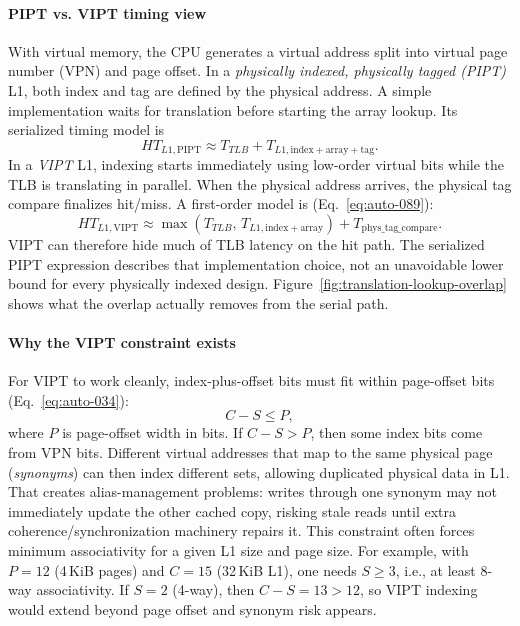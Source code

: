 \paragraph{PIPT vs. VIPT timing view}\label{par:auto-074}
With virtual memory, the CPU generates a virtual address split into virtual page number (VPN) and page offset.
In a \textit{physically indexed, physically tagged (PIPT)} L1, both index and tag are defined by the physical address.
A simple implementation waits for translation before starting the array lookup.
Its serialized timing model is
\begin{equation}\label{eq:auto-088}
    HT_{L1,\mathrm{PIPT}} \approx T_{TLB}+T_{L1,\mathrm{index+array+tag}}.
\end{equation}
In a \textit{VIPT} L1, indexing starts immediately using low-order virtual bits while the TLB is translating in parallel.
When the physical address arrives, the physical tag compare finalizes hit/miss.
A first-order model is (Eq.~\eqref{eq:auto-089}):
\begin{equation}\label{eq:auto-089}
    HT_{L1,\mathrm{VIPT}} \approx \max\!\left(T_{TLB},\,T_{L1,\mathrm{index+array}}\right)+T_{\mathrm{phys\_tag\_compare}}.
\end{equation}
VIPT can therefore hide much of TLB latency on the hit path.
The serialized PIPT expression describes that implementation choice, not an unavoidable lower bound for every physically indexed design.
Figure~\ref{fig:translation-lookup-overlap} shows what the overlap actually removes from the serial path.


\paragraph{Why the VIPT constraint exists}\label{par:auto-075}
For VIPT to work cleanly, index-plus-offset bits must fit within page-offset bits (Eq.~\eqref{eq:auto-034}):
\begin{equation}\label{eq:auto-034}
    C-S \le P,
\end{equation}
where $P$ is page-offset width in bits.
If $C-S>P$, then some index bits come from VPN bits.
Different virtual addresses that map to the same physical page (\textit{synonyms}) can then index different sets, allowing duplicated physical data in L1.
That creates alias-management problems: writes through one synonym may not immediately update the other cached copy, risking stale reads until extra coherence/synchronization machinery repairs it.
This constraint often forces minimum associativity for a given L1 size and page size.
For example, with $P=12$ (4\,KiB pages) and $C=15$ (32\,KiB L1), one needs $S\ge 3$, i.e., at least 8-way associativity.
If $S=2$ (4-way), then $C-S=13>12$, so VIPT indexing would extend beyond page offset and synonym risk appears.

